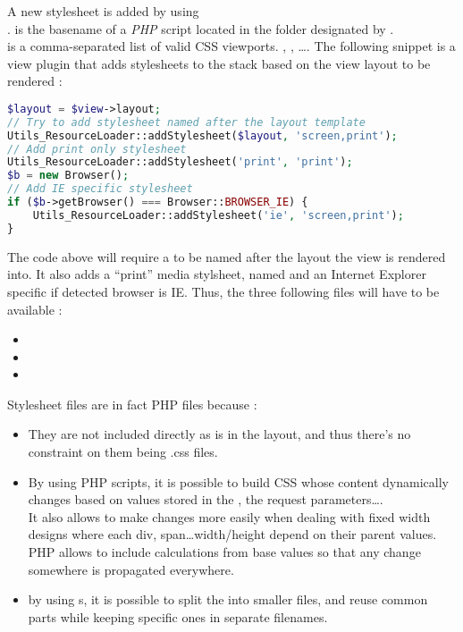 \documentclass[pdftex,12pt,a4paper]{article}
\begin{document}
A new stylesheet is added by using \\
.
 is the basename of a \emph{PHP} script located in the folder designated by .\\
 is a comma-separated list of valid CSS viewports. \eg {}, , \ldots.
The following snippet is a view plugin that adds stylesheets to the stack based on the view layout to be rendered :
\begin{lstlisting}[label="add-style-sample",caption="Sample to add stylesheets to the stack",language=php]
$layout = $view->layout;
// Try to add stylesheet named after the layout template
Utils_ResourceLoader::addStylesheet($layout, 'screen,print');
// Add print only stylesheet
Utils_ResourceLoader::addStylesheet('print', 'print');
$b = new Browser();
// Add IE specific stylesheet
if ($b->getBrowser() === Browser::BROWSER_IE) {
	Utils_ResourceLoader::addStylesheet('ie', 'screen,print');
}
\end{lstlisting}
The code above will require a  to be named after the layout the view is rendered into. It also adds a ``print'' media stylsheet, named  and an Internet Explorer specific  if detected browser is IE.
Thus, the three following files will have to be available :
\begin{itemize}
	\item {}
	\item {}
	\item {}
\end{itemize}

Stylesheet files are in fact PHP files because :
\begin{itemize}
	\item They are not included directly as is in the layout, and thus there's no constraint on them being .css files.
	\item By using PHP scripts, it is possible to build CSS whose content dynamically changes based on values stored in the , the request parameters\ldots.\\
	It also allows to make changes more easily when dealing with fixed width designs where each div, span\ldots width/height depend on their parent values. PHP allows to
	include calculations from base values so that any change somewhere is propagated everywhere.
	\item by using s, it is possible to split the  into smaller files, and reuse common parts while keeping specific ones in separate filenames.
\end{itemize}
\end{document}
